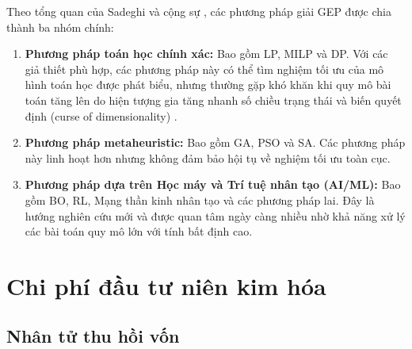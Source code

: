 Theo tổng quan của Sadeghi và cộng sự \cite{sadeghi2017gep_review}, các phương pháp giải GEP được chia thành ba nhóm chính:

\begin{enumerate}
    \item \textbf{Phương pháp toán học chính xác:} Bao gồm LP, MILP và DP. Với các giả thiết phù hợp, các phương pháp này có thể tìm nghiệm tối ưu của mô hình toán học được phát biểu, nhưng thường gặp khó khăn khi quy mô bài toán tăng lên do hiện tượng gia tăng nhanh số chiều trạng thái và biến quyết định (curse of dimensionality) \cite{oree2017gep_review}.
    
    \item \textbf{Phương pháp metaheuristic:} Bao gồm GA, PSO và SA. Các phương pháp này linh hoạt hơn nhưng không đảm bảo hội tụ về nghiệm tối ưu toàn cục.
    
    \item \textbf{Phương pháp dựa trên Học máy và Trí tuệ nhân tạo (AI/ML):} Bao gồm BO, RL, Mạng thần kinh nhân tạo và các phương pháp lai. Đây là hướng nghiên cứu mới và được quan tâm ngày càng nhiều nhờ khả năng xử lý các bài toán quy mô lớn với tính bất định cao.
\end{enumerate}

\section{Chi phí đầu tư niên kim hóa}

\subsection{Nhân tử thu hồi vốn}

